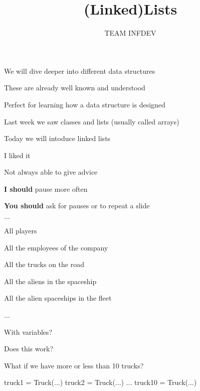 \documentclass{beamer}
\title{(Linked)Lists}
\author{TEAM INFDEV}
\institute{Hogeschool Rotterdam \\ 
Rotterdam, Netherlands}
\date{}
\begin{document}
\maketitle

\begin{slide}{
\item We will dive deeper into different data structures
\item These are already well known and understood
\item Perfect for learning how a data structure is designed
\item Last week we saw classes and lists (usually called arrays)
\item Today we will intoduce linked lists
}\end{slide}


\begin{slide}{
\item I liked it
\item Not always able to give advice
\item \textbf{I should} pause more often
\item \textbf{You should} ask for pauses or to repeat a slide
\item $\ldots$
}\end{slide}

\begin{slide}{
\item All players
\item All the employees of the company
\item All the trucks on the road
\item All the aliens in the spaceship
\item All the alien spaceships in the fleet
\item ...
}\end{slide}

\begin{frame}[fragile]{With variables?}
\begin{codewithblock}{\pause \item Does this work? \item What if we have more or less than 10 trucks?}
truck1 = Truck(...)
truck2 = Truck(...)
...
truck10 = Truck(...)
\end{codewithblock}
\end{frame}
\end{document}
